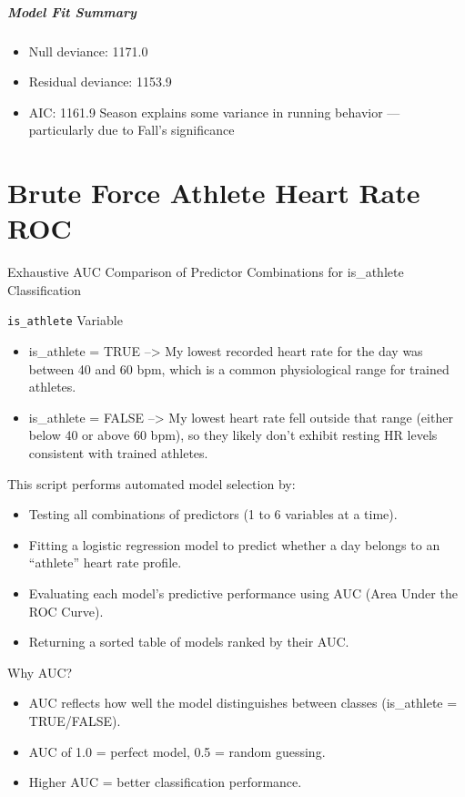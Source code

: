 \documentclass[
  11pt,
]{article}
\providecommand{\tightlist}{%
  \setlength{\itemsep}{0pt}\setlength{\parskip}{0pt}}
\begin{document}
\subparagraph{Model Fit Summary}\label{model-fit-summary}

\begin{itemize}
\tightlist
\item
  Null deviance: 1171.0
\item
  Residual deviance: 1153.9
\item
  AIC: 1161.9 Season explains some variance in running behavior ---
  particularly due to Fall's significance
\end{itemize}

\section{Brute Force Athlete Heart Rate
ROC}\label{brute-force-athlete-heart-rate-roc}

Exhaustive AUC Comparison of Predictor Combinations for is\_athlete
Classification

\texttt{is\_athlete} Variable

\begin{itemize}
\item
  is\_athlete = TRUE --\textgreater{} My lowest recorded heart rate for
  the day was between 40 and 60 bpm, which is a common physiological
  range for trained athletes.
\item
  is\_athlete = FALSE --\textgreater{} My lowest heart rate fell outside
  that range (either below 40 or above 60 bpm), so they likely don't
  exhibit resting HR levels consistent with trained athletes.
\end{itemize}

This script performs automated model selection by:

\begin{itemize}
\tightlist
\item
  Testing all combinations of predictors (1 to 6 variables at a time).
\item
  Fitting a logistic regression model to predict whether a day belongs
  to an ``athlete'' heart rate profile.
\item
  Evaluating each model's predictive performance using AUC (Area Under
  the ROC Curve).
\item
  Returning a sorted table of models ranked by their AUC.
\end{itemize}

Why AUC?

\begin{itemize}
\tightlist
\item
  AUC reflects how well the model distinguishes between classes
  (is\_athlete = TRUE/FALSE).
\item
  AUC of 1.0 = perfect model, 0.5 = random guessing.
\item
  Higher AUC = better classification performance.
\end{itemize}
\end{document}

